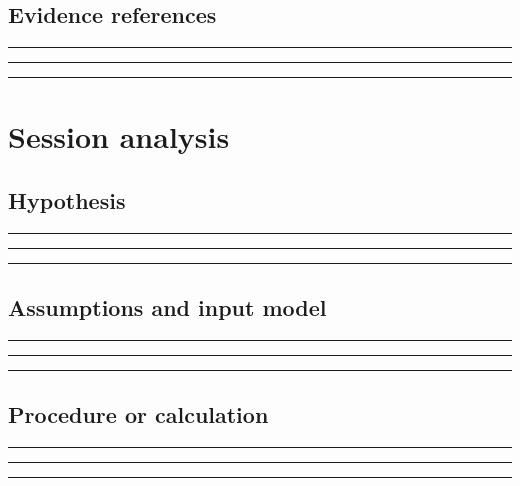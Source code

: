 \documentclass[11pt]{article}
\begin{document}
\subsection{Evidence references}
\noindent\rule{\linewidth}{0.35pt}\par\vspace{0.22in}
\noindent\rule{\linewidth}{0.35pt}\par\vspace{0.22in}
\noindent\rule{\linewidth}{0.35pt}\par\vspace{0.18in}
\clearpage

\section{Session analysis}

\subsection{Hypothesis}
\noindent\rule{\linewidth}{0.35pt}\par\vspace{0.22in}
\noindent\rule{\linewidth}{0.35pt}\par\vspace{0.22in}
\noindent\rule{\linewidth}{0.35pt}\par\vspace{0.18in}

\subsection{Assumptions and input model}
\noindent\rule{\linewidth}{0.35pt}\par\vspace{0.22in}
\noindent\rule{\linewidth}{0.35pt}\par\vspace{0.22in}
\noindent\rule{\linewidth}{0.35pt}\par\vspace{0.18in}

\subsection{Procedure or calculation}
\noindent\rule{\linewidth}{0.35pt}\par\vspace{0.22in}
\noindent\rule{\linewidth}{0.35pt}\par\vspace{0.22in}
\noindent\rule{\linewidth}{0.35pt}\par\vspace{0.18in}
\end{document}
